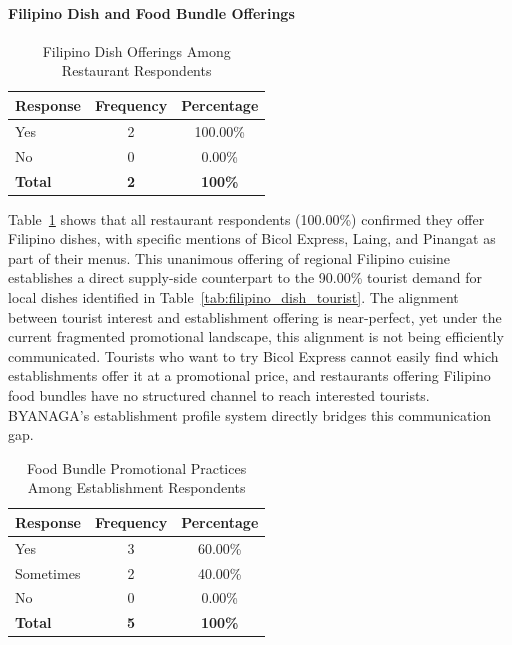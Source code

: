\documentclass{research}
\begin{document}
\paragraph{Filipino Dish and Food Bundle Offerings}

\begin{table}[h]
    \centering
    \begin{tabular}{|l|c|c|}
        \hline
        \textbf{Response} & \textbf{Frequency} & \textbf{Percentage} \\
        \hline
        Yes & 2 & 100.00\% \\
        No  & 0 & 0.00\%   \\
        \hline
        \textbf{Total} & \textbf{2} & \textbf{100\%} \\
        \hline
    \end{tabular}
    \caption{Filipino Dish Offerings Among Restaurant Respondents}
    \label{tab:filipino_dish_estab}
\end{table}

Table~\ref{tab:filipino_dish_estab} shows that all restaurant respondents 
(100.00\%) confirmed they offer Filipino dishes, with specific mentions of 
Bicol Express, Laing, and Pinangat as part of their menus. This unanimous 
offering of regional Filipino cuisine establishes a direct supply-side 
counterpart to the 90.00\% tourist demand for local dishes identified in 
Table~\ref{tab:filipino_dish_tourist}. The alignment between tourist interest 
and establishment offering is near-perfect, yet under the current fragmented 
promotional landscape, this alignment is not being efficiently communicated. 
Tourists who want to try Bicol Express cannot easily find which establishments 
offer it at a promotional price, and restaurants offering Filipino food bundles 
have no structured channel to reach interested tourists. BYANAGA's establishment 
profile system directly bridges this communication gap.

\begin{table}[h]
    \centering
    \begin{tabular}{|l|c|c|}
        \hline
        \textbf{Response} & \textbf{Frequency} & \textbf{Percentage} \\
        \hline
        Yes       & 3 & 60.00\% \\
        Sometimes & 2 & 40.00\% \\
        No        & 0 & 0.00\%  \\
        \hline
        \textbf{Total} & \textbf{5} & \textbf{100\%} \\
        \hline
    \end{tabular}
    \caption{Food Bundle Promotional Practices Among Establishment Respondents}
    \label{tab:food_bundle_estab}
\end{table}
\end{document}
